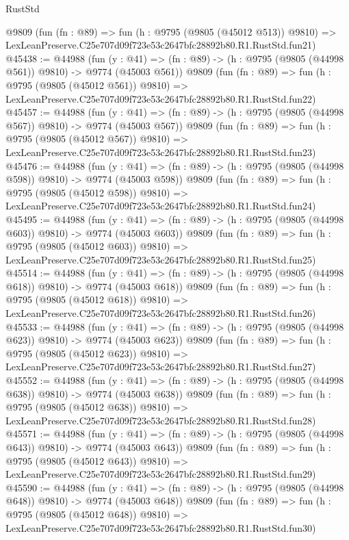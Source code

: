 \begin{lexlean}{RustStd}
\begin{coremodule}
    @9809
    (fun (fn : @89) =>
    fun (h : @9795 (@9805 (@45012 @513)) @9810) =>
    LexLeanPreserve.C25e707d09f723e53c2647bfc28892b80.R1.RustStd.fun21)
@45438 := @44988
    (fun (y : @41) => (fn : @89) -> (h : @9795 (@9805 (@44998 @561)) @9810) -> @9774 (@45003 @561))
    @9809
    (fun (fn : @89) =>
    fun (h : @9795 (@9805 (@45012 @561)) @9810) =>
    LexLeanPreserve.C25e707d09f723e53c2647bfc28892b80.R1.RustStd.fun22)
@45457 := @44988
    (fun (y : @41) => (fn : @89) -> (h : @9795 (@9805 (@44998 @567)) @9810) -> @9774 (@45003 @567))
    @9809
    (fun (fn : @89) =>
    fun (h : @9795 (@9805 (@45012 @567)) @9810) =>
    LexLeanPreserve.C25e707d09f723e53c2647bfc28892b80.R1.RustStd.fun23)
@45476 := @44988
    (fun (y : @41) => (fn : @89) -> (h : @9795 (@9805 (@44998 @598)) @9810) -> @9774 (@45003 @598))
    @9809
    (fun (fn : @89) =>
    fun (h : @9795 (@9805 (@45012 @598)) @9810) =>
    LexLeanPreserve.C25e707d09f723e53c2647bfc28892b80.R1.RustStd.fun24)
@45495 := @44988
    (fun (y : @41) => (fn : @89) -> (h : @9795 (@9805 (@44998 @603)) @9810) -> @9774 (@45003 @603))
    @9809
    (fun (fn : @89) =>
    fun (h : @9795 (@9805 (@45012 @603)) @9810) =>
    LexLeanPreserve.C25e707d09f723e53c2647bfc28892b80.R1.RustStd.fun25)
@45514 := @44988
    (fun (y : @41) => (fn : @89) -> (h : @9795 (@9805 (@44998 @618)) @9810) -> @9774 (@45003 @618))
    @9809
    (fun (fn : @89) =>
    fun (h : @9795 (@9805 (@45012 @618)) @9810) =>
    LexLeanPreserve.C25e707d09f723e53c2647bfc28892b80.R1.RustStd.fun26)
@45533 := @44988
    (fun (y : @41) => (fn : @89) -> (h : @9795 (@9805 (@44998 @623)) @9810) -> @9774 (@45003 @623))
    @9809
    (fun (fn : @89) =>
    fun (h : @9795 (@9805 (@45012 @623)) @9810) =>
    LexLeanPreserve.C25e707d09f723e53c2647bfc28892b80.R1.RustStd.fun27)
@45552 := @44988
    (fun (y : @41) => (fn : @89) -> (h : @9795 (@9805 (@44998 @638)) @9810) -> @9774 (@45003 @638))
    @9809
    (fun (fn : @89) =>
    fun (h : @9795 (@9805 (@45012 @638)) @9810) =>
    LexLeanPreserve.C25e707d09f723e53c2647bfc28892b80.R1.RustStd.fun28)
@45571 := @44988
    (fun (y : @41) => (fn : @89) -> (h : @9795 (@9805 (@44998 @643)) @9810) -> @9774 (@45003 @643))
    @9809
    (fun (fn : @89) =>
    fun (h : @9795 (@9805 (@45012 @643)) @9810) =>
    LexLeanPreserve.C25e707d09f723e53c2647bfc28892b80.R1.RustStd.fun29)
@45590 := @44988
    (fun (y : @41) => (fn : @89) -> (h : @9795 (@9805 (@44998 @648)) @9810) -> @9774 (@45003 @648))
    @9809
    (fun (fn : @89) =>
    fun (h : @9795 (@9805 (@45012 @648)) @9810) =>
    LexLeanPreserve.C25e707d09f723e53c2647bfc28892b80.R1.RustStd.fun30)

\end{coremodule}
\end{lexlean}
